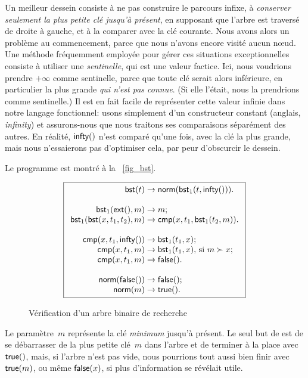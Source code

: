 Un meilleur dessein consiste à ne pas construire le parcours infixe, à
\emph{conserver seulement la plus petite clé jusqu'à présent}, en
supposant que l'arbre est traversé de droite à gauche, et à la
comparer avec la clé courante. Nous avons alors un problème au
commencement, parce que nous n'avons encore visité aucun n{\oe}ud. Une
méthode fréquemment employée pour gérer ces situations exceptionnelles
consiste à utiliser une \emph{sentinelle}, qui est
une valeur factice. Ici, nous voudrions prendre \(+\infty\) comme
sentinelle, parce que toute clé serait alors inférieure, en
particulier la plus grande \emph{qui n'est pas connue}. (Si elle
l'était, nous la prendrions comme sentinelle.) Il est en fait facile
de représenter cette valeur infinie dans notre langage fonctionnel:
usons simplement d'un constructeur constant
 (anglais, \emph{infinity}) et
assurons-nous que nous traitons ses comparaisons séparément des
autres. En réalité, \(\textsf{infty}()\) n'est
comparé qu'une fois, avec la clé la plus grande, mais nous
n'essaierons pas d'optimiser cela, par peur d'obscurcir le dessein.

Le programme est montré à la
\fig~\vref{fig_bst}.
\begin{figure}[t]
\begin{equation*}
\boxed{
\begin{array}{r@{\;}l@{\;}l}
  \fun{bst}(t) & \rightarrow & \fun{norm}(\fun{bst}_1(t,\fun{infty}())).\\
  \\
  \fun{bst}_1(\fun{ext}(),m) & \rightarrow & m;\\
  \fun{bst}_1(\fun{bst}(x,t_1,t_2),m) & \rightarrow & 
  \fun{cmp}(x,t_1,\fun{bst}_1(t_2,m)).\\
\\
\fun{cmp}(x,t_1,\fun{infty}()) & \rightarrow & \fun{bst}_1(t_1,x);\\
\fun{cmp}(x,t_1,m) & \rightarrow &
  \fun{bst}_1(t_1,x), \,\text{si \(m \succ x\)};\\
\fun{cmp}(x,t_1,m) & \rightarrow & \fun{false}().\\
\\
\fun{norm}(\fun{false}()) & \rightarrow & \fun{false}();\\
\fun{norm}(m) & \rightarrow & \fun{true}().
\end{array}}
\end{equation*}
\caption{Vérification d'un arbre binaire de recherche\label{fig_bst}}
\end{figure}
Le paramètre~\(m\) représente la clé \emph{minimum} jusqu'à
présent. Le seul but de  est de
se débarrasser de la plus petite clé~\(m\) dans l'arbre et de terminer
à la place avec \(\textsf{true}()\), mais, si l'arbre n'est pas vide,
nous pourrions tout aussi bien finir avec \(\textsf{true}(m)\), ou même
\(\textsf{false}(x)\), si plus d'information se révélait
utile.

